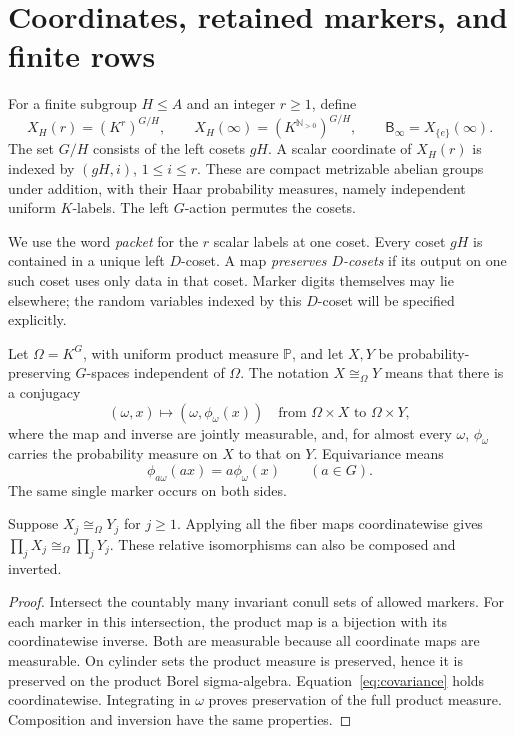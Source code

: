 \documentclass[11pt,a4paper]{article}
\numberwithin{equation}{section}
\newcommand{\NN}{\mathbb N}
\newcommand{\Prob}{\mathbb P}
\newcommand{\reliso}{\mathrel{\cong_{\Omega}}}
\newcommand{\Binf}{\mathsf B_\infty}
\begin{document}
\section{Coordinates, retained markers, and finite rows}\label{sec:notation}

For a finite subgroup $H\leq A$ and an integer $r\geq1$, define
\[
 X_H(r)=(K^r)^{G/H},\qquad
 X_H(\infty)=(K^{\NN_{>0}})^{G/H},\qquad
 \Binf=X_{\{e\}}(\infty).
\]
The set $G/H$ consists of the left cosets $gH$. A scalar coordinate of
$X_H(r)$ is indexed by $(gH,i)$, $1\leq i\leq r$. These are compact
metrizable abelian groups under addition, with their Haar probability
measures, namely independent uniform $K$-labels. The left $G$-action
permutes the cosets.

We use the word \emph{packet} for the $r$ scalar labels at one coset.
Every coset $gH$ is contained in a unique left $D$-coset. A map
\emph{preserves $D$-cosets} if its output on one such coset uses only
data in that coset. Marker digits themselves may lie elsewhere; the
random variables indexed by this $D$-coset will be specified explicitly.

\begin{definition}\label{def:relative}
Let $\Omega=K^G$, with uniform product measure $\Prob$, and let $X,Y$ be
probability-preserving $G$-spaces independent of $\Omega$. The notation
$X\reliso Y$ means that there is a conjugacy
\[
 (\omega,x)\longmapsto(\omega,\phi_\omega(x))
 \quad\text{from }\Omega\times X\text{ to }\Omega\times Y,
\]
where the map and inverse are jointly measurable, and, for almost every
$\omega$, $\phi_\omega$ carries the probability measure on $X$ to that on
$Y$. Equivariance means
\begin{equation}\label{eq:covariance}
 \phi_{a\omega}(ax)=a\phi_\omega(x)\qquad(a\in G).
\end{equation}
The same single marker occurs on both sides.
\end{definition}

\begin{lemma}\label{lem:relative-products}
Suppose $X_j\reliso Y_j$ for $j\geq1$. Applying all the fiber maps
coordinatewise gives $\prod_j X_j\reliso\prod_j Y_j$. These relative
isomorphisms can also be composed and inverted.
\end{lemma}
\begin{proof}
Intersect the countably many invariant conull sets of allowed markers.
For each marker in this intersection, the product map is a bijection
with its coordinatewise inverse. Both are measurable because all
coordinate maps are measurable. On cylinder sets the product measure is
preserved, hence it is preserved on the product Borel sigma-algebra.
Equation~\eqref{eq:covariance} holds coordinatewise. Integrating in
$\omega$ proves preservation of the full product measure. Composition
and inversion have the same properties.
\end{proof}
\end{document}
